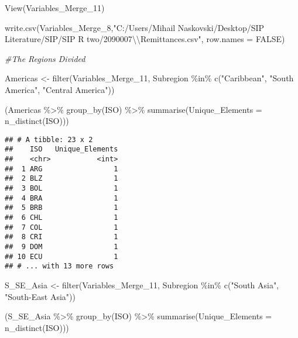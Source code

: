 \documentclass[
]{article}
\newenvironment{Shaded}{\begin{snugshade}}{\end{snugshade}}
\newcommand{\AttributeTok}[1]{\textcolor[rgb]{0.77,0.63,0.00}{#1}}
\newcommand{\CommentTok}[1]{\textcolor[rgb]{0.56,0.35,0.01}{\textit{#1}}}
\newcommand{\ConstantTok}[1]{\textcolor[rgb]{0.00,0.00,0.00}{#1}}
\newcommand{\FunctionTok}[1]{\textcolor[rgb]{0.00,0.00,0.00}{#1}}
\newcommand{\NormalTok}[1]{#1}
\newcommand{\OtherTok}[1]{\textcolor[rgb]{0.56,0.35,0.01}{#1}}
\newcommand{\SpecialCharTok}[1]{\textcolor[rgb]{0.00,0.00,0.00}{#1}}
\newcommand{\StringTok}[1]{\textcolor[rgb]{0.31,0.60,0.02}{#1}}
\begin{document}
\begin{Shaded}
\begin{Highlighting}[]
\FunctionTok{View}\NormalTok{(Variables\_Merge\_11)}

\FunctionTok{write.csv}\NormalTok{(Variables\_Merge\_8,}\StringTok{"C:/Users/Mihail Naskovski/Desktop/SIP Literature/SIP/SIP R two/2090007}\SpecialCharTok{\textbackslash{}\textbackslash{}}\StringTok{Remittances.csv"}\NormalTok{, }\AttributeTok{row.names =} \ConstantTok{FALSE}\NormalTok{)}
\end{Highlighting}
\end{Shaded}

\begin{Shaded}
\begin{Highlighting}[]
\CommentTok{\#The Regions Divided}

\NormalTok{Americas }\OtherTok{\textless{}{-}} \FunctionTok{filter}\NormalTok{(Variables\_Merge\_11, Subregion }\SpecialCharTok{\%in\%} \FunctionTok{c}\NormalTok{(}\StringTok{"Caribbean"}\NormalTok{, }\StringTok{"South America"}\NormalTok{, }\StringTok{"Central America"}\NormalTok{))}

\NormalTok{(Americas }\SpecialCharTok{\%\textgreater{}\%}                   
  \FunctionTok{group\_by}\NormalTok{(ISO) }\SpecialCharTok{\%\textgreater{}\%}          
  \FunctionTok{summarise}\NormalTok{(}\AttributeTok{Unique\_Elements =} \FunctionTok{n\_distinct}\NormalTok{(ISO)))}
\end{Highlighting}
\end{Shaded}

\begin{verbatim}
## # A tibble: 23 x 2
##    ISO   Unique_Elements
##    <chr>           <int>
##  1 ARG                 1
##  2 BLZ                 1
##  3 BOL                 1
##  4 BRA                 1
##  5 BRB                 1
##  6 CHL                 1
##  7 COL                 1
##  8 CRI                 1
##  9 DOM                 1
## 10 ECU                 1
## # ... with 13 more rows
\end{verbatim}

\begin{Shaded}
\begin{Highlighting}[]
\NormalTok{S\_SE\_Asia }\OtherTok{\textless{}{-}} \FunctionTok{filter}\NormalTok{(Variables\_Merge\_11, Subregion }\SpecialCharTok{\%in\%} \FunctionTok{c}\NormalTok{(}\StringTok{"South Asia"}\NormalTok{, }\StringTok{"South{-}East Asia"}\NormalTok{))}

\NormalTok{(S\_SE\_Asia }\SpecialCharTok{\%\textgreater{}\%}                   
  \FunctionTok{group\_by}\NormalTok{(ISO) }\SpecialCharTok{\%\textgreater{}\%}          
  \FunctionTok{summarise}\NormalTok{(}\AttributeTok{Unique\_Elements =} \FunctionTok{n\_distinct}\NormalTok{(ISO)))}
\end{Highlighting}
\end{Shaded}
\end{document}
